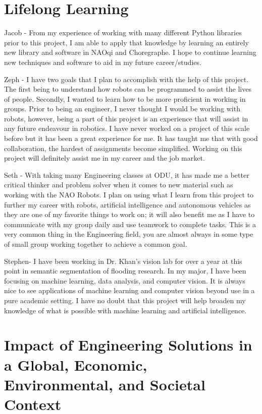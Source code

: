\section{Lifelong Learning}
Jacob - From my experience of working with many different Python libraries prior to this project, I am able to apply that knowledge by learning an entirely new library and software in NAOqi and Choregraphe. I hope to continue learning new techniques and software to aid in my future career/studies. \par
	Zeph - I have two goals that I plan to accomplish with the help of this project. The first being to understand how robots can be programmed to assist the lives of people. Secondly, I wanted to learn how to be more proficient in working in groups. Prior to being an engineer, I never thought I would be working with robots, however, being a part of this project is an experience that will assist in any future endeavour in robotics. I have never worked on a project of this scale before but it has been a great experience for me. It has taught me that with good collaboration, the hardest of assignments become simplified. Working on this project will definitely assist me in my career and the job market. \par 
	Seth - With taking many Engineering classes at ODU, it has made me a better critical thinker and problem solver when it comes to new material such as working with the NAO Robots. I plan on using what I learn from this project to further my career with robots, artificial intelligence and autonomous vehicles as they are one of my favorite things to work on; it will also benefit me as I have to communicate with my group daily and use teamwork to complete tasks. This is a very common thing in the Engineering field, you are almost always in some type of small group working together to achieve a common goal. \par 
	Stephen- I have been working in Dr. Khan’s vision lab for over a year at this point in semantic segmentation of flooding research. In my major, I have been focusing on machine learning, data analysis, and computer vision. It is always nice to see applications of machine learning and computer vision beyond use in a pure academic setting. I have no doubt that this project will help broaden my knowledge of what is possible with machine learning and artificial intelligence. \par 


\section{Impact of Engineering Solutions in a Global, Economic, Environmental, and Societal Context}
